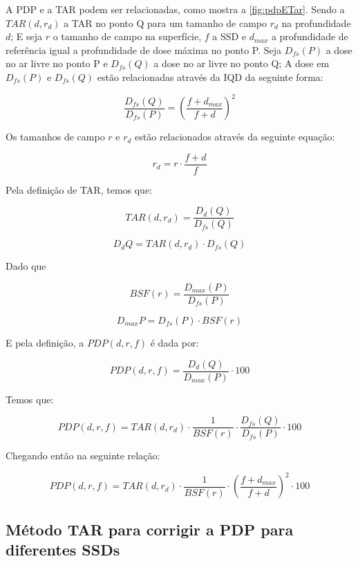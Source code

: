 \documentclass[11pt,a4paper]{article}
\begin{document}
	A PDP e a TAR podem ser relacionadas, como mostra a \ref{fig:pdpETar}. Sendo a $TAR(d, r_d)$ a TAR no ponto Q para um tamanho de campo $r_d$ na profundidade $d$; E seja $r$ o tamanho de campo na superfície, $f$ a SSD e $d_{max}$ a profundidade de referência igual a profundidade de dose máxima no ponto P. Seja $D_{fs}(P)$ a dose no ar livre no ponto P e $D_{fs}(Q)$ a dose no ar livre no ponto Q; A dose em $D_{fs}(P)$ e $D_{fs}(Q)$ estão relacionadas através da IQD da seguinte forma:

		\begin{equation}
			\frac{D_{fs}(Q)}{D_{fs}(P)} = \left(\frac{f + d_{max}}{f + d}\right)^2
		\end{equation}

	Os tamanhos de campo $r$ e $r_d$ estão relacionados através da seguinte equação:

		\begin{equation}
			r_d = r \cdot \frac{f + d}{f}
		\end{equation}

	Pela definição de TAR, temos que:

		$$TAR(d, r_d) = \frac{D_d(Q)}{D_{fs}(Q)}$$

	\begin{equation}
		D_d{Q} = TAR(d, r_d) \cdot D_{fs}(Q)
	\end{equation}

	Dado que 

		$$BSF(r) = \frac{D_{max}(P)}{D_{fs}(P)}$$

		$$D_{max}{P} = D_{fs}(P) \cdot BSF(r)$$

	E pela definição, a $PDP(d, r, f)$ é dada por:

		$$PDP(d, r, f) = \frac{D_d(Q)}{D_{max}(P)} \cdot 100$$

	Temos que:

		$$PDP(d, r, f) = TAR(d, r_d) \cdot \frac{1}{BSF(r)} \cdot \frac{D_{fs}(Q)}{D_{fs}(P)} \cdot 100$$

	Chegando então na seguinte relação:

	\begin{equation}
		PDP(d, r, f) = TAR(d, r_d) \cdot \frac{1}{BSF(r)} \cdot \left(\frac{f + d_{max}}{f + d}\right)^2 \cdot 100
		\label{eq:tarParaPdp}
	\end{equation}

	\subsection{Método TAR para corrigir a PDP para diferentes SSDs}
\end{document}
